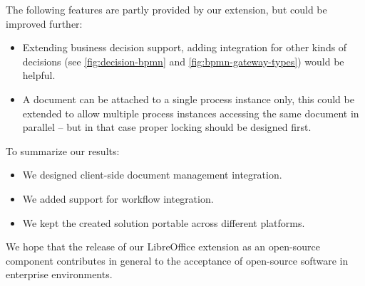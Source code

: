 The following features are partly provided by our extension, but could be
improved further:

\begin{itemize}
\item Extending business decision support, adding integration for other kinds of
decisions (see \autoref{fig:decision-bpmn} and
\autoref{fig:bpmn-gateway-types}) would be helpful.
\item A document can be attached to a single process instance only, this could
be extended to allow multiple process instances accessing the same document in
parallel -- but in that case proper locking should be designed first.
\end{itemize}

To summarize our results:

\begin{itemize}
\item We designed client-side document management integration.
\item We added support for workflow integration.
\item We kept the created solution portable across different platforms.
\end{itemize}

We hope that the release of our LibreOffice extension as an open-source
component contributes in general to the acceptance of open-source software in
enterprise environments.
